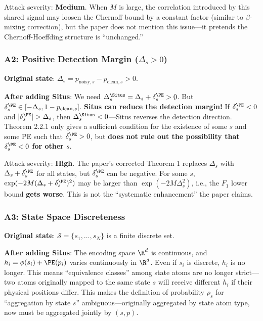 \documentclass[
  12pt,
]{article}
\begin{document}
Attack severity: \textbf{Medium}. When \(M\) is large, the correlation introduced by this shared signal may loosen the Chernoff bound by a constant factor (similar to \(\beta\)-mixing correction), but the paper does not mention this issue---it pretends the Chernoff-Hoeffding structure is ``unchanged.''

\subsubsection{A2: Positive Detection Margin (\(\Delta_s > 0\))}\label{a2-positive-detection-margin}

\textbf{Original state}: \(\Delta_s = p_{\text{noisy},s} - p_{\text{clean},s} > 0\).

\textbf{After adding Situs}: We need \(\Delta_s^{\Situs} = \Delta_s + \delta_s^{\PE} > 0\). But \(\delta_s^{\PE} \in [-\Delta_s, 1-p_{\text{clean},s}]\). \textbf{Situs can reduce the detection margin!} If \(\delta_s^{\PE} < 0\) and \(|\delta_s^{\PE}| > \Delta_s\), then \(\Delta_s^{\Situs} < 0\)---Situs reverses the detection direction. Theorem 2.2.1 only gives a sufficient condition for the existence of some \(s\) and some PE such that \(\delta_s^{\PE} > 0\), but \textbf{does not rule out the possibility that \(\delta_s^{\PE} < 0\) for other \(s\)}.

Attack severity: \textbf{High}. The paper's corrected Theorem 1 replaces \(\Delta_s\) with \(\Delta_s + \delta_s^{\PE}\) for all states, but \(\delta_s^{\PE}\) can be negative. For some \(s\), \(\exp(-2M(\Delta_s + \delta_s^{\PE})^2)\) may be larger than \(\exp(-2M\Delta_s^2)\), i.e., the \(F_1\) lower bound \textbf{gets worse}. This is not the ``systematic enhancement'' the paper claims.

\subsubsection{A3: State Space Discreteness}\label{a3-state-space-discreteness}

\textbf{Original state}: \(\mathcal{S} = \{s_1, \ldots, s_N\}\) is a finite discrete set.

\textbf{After adding Situs}: The encoding space \(\R^d\) is continuous, and \(h_i = \phi(s_i) + \PE(p_i)\) varies continuously in \(\R^d\). Even if \(s_i\) is discrete, \(h_i\) is no longer. This means ``equivalence classes'' among state atoms are no longer strict---two atoms originally mapped to the same state \(s\) will receive different \(h_i\) if their physical positions differ. This makes the definition of probability \(\rho_s\) for ``aggregation by state \(s\)'' ambiguous---originally aggregated by state atom type, now must be aggregated jointly by \((s, p)\).
\end{document}
